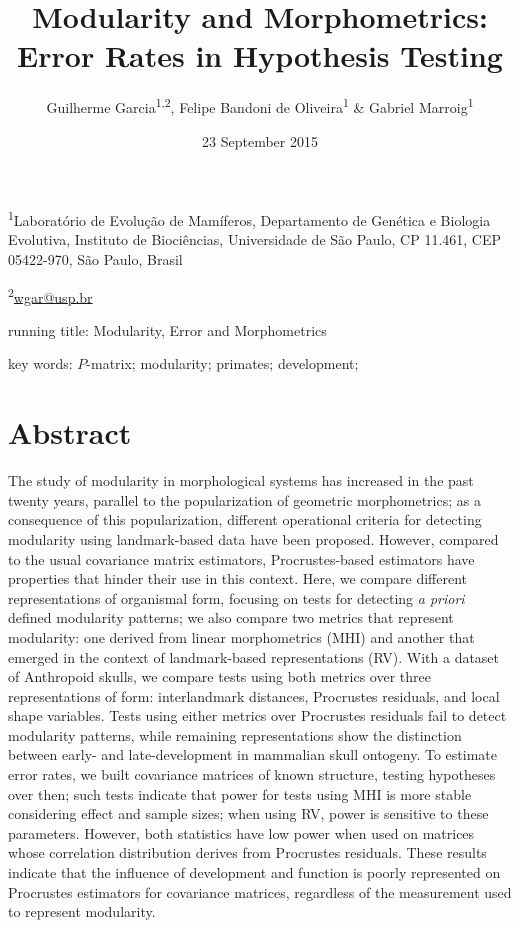 \documentclass[12pt,]{article}
\title{Modularity and Morphometrics: Error Rates in Hypothesis Testing}
\author{Guilherme Garcia\textsuperscript{1,2}, Felipe Bandoni de
Oliveira\textsuperscript{1} \& Gabriel Marroig\textsuperscript{1}}
\date{23 September 2015}
\begin{document}
\maketitle


\linenumbers
\modulolinenumbers[2]

\onehalfspacing

\textsuperscript{1}Laboratório de Evolução de Mamíferos, Departamento de
Genética e Biologia Evolutiva, Instituto de Biociências, Universidade de
São Paulo, CP 11.461, CEP 05422-970, São Paulo, Brasil

\textsuperscript{2}\href{mailto:wgar@usp.br}{wgar@usp.br}

running title: Modularity, Error and Morphometrics

key words: $P$-matrix; modularity; primates; development;

\section{Abstract}\label{abstract}

The study of modularity in morphological systems has increased in the
past twenty years, parallel to the popularization of geometric
morphometrics; as a consequence of this popularization, different
operational criteria for detecting modularity using landmark-based data
have been proposed. However, compared to the usual covariance matrix
estimators, Procrustes-based estimators have properties that hinder
their use in this context. Here, we compare different representations of
organismal form, focusing on tests for detecting \emph{a priori} defined
modularity patterns; we also compare two metrics that represent
modularity: one derived from linear morphometrics (MHI) and another that
emerged in the context of landmark-based representations (RV). With a
dataset of Anthropoid skulls, we compare tests using both metrics over
three representations of form: interlandmark distances, Procrustes
residuals, and local shape variables. Tests using either metrics over
Procrustes residuals fail to detect modularity patterns, while remaining
representations show the distinction between early- and late-development
in mammalian skull ontogeny. To estimate error rates, we built
covariance matrices of known structure, testing hypotheses over then;
such tests indicate that power for tests using MHI is more stable
considering effect and sample sizes; when using RV, power is sensitive
to these parameters. However, both statistics have low power when used
on matrices whose correlation distribution derives from Procrustes
residuals. These results indicate that the influence of development and
function is poorly represented on Procrustes estimators for covariance
matrices, regardless of the measurement used to represent modularity.
\end{document}
